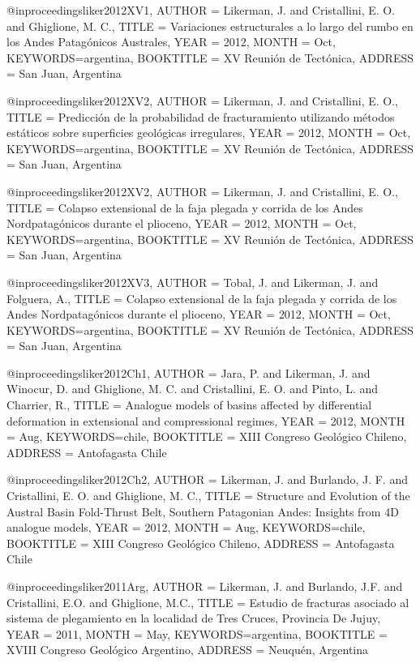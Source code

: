 @inproceedings{liker2012XV1,
  AUTHOR = {Likerman, J. and Cristallini, E. O. and Ghiglione, M. C.},
  TITLE = {{Variaciones estructurales a lo largo del rumbo en los Andes Patag{\'o}nicos Australes}},
  YEAR = {2012},
  MONTH = Oct,
  KEYWORDS={argentina},
  BOOKTITLE = {{XV Reuni{\'o}n de Tect{\'o}nica}},
  ADDRESS = {San Juan, Argentina}
}

@inproceedings{liker2012XV2,
  AUTHOR = {Likerman, J. and Cristallini, E. O.},
  TITLE = {{Predicci{\'o}n de la probabilidad de fracturamiento utilizando m{\'e}todos est{\'a}ticos sobre superficies geol{\'o}gicas irregulares}},
  YEAR = {2012},
  MONTH = Oct,
  KEYWORDS={argentina},
  BOOKTITLE = {{XV Reuni{\'o}n de Tect{\'o}nica}},
  ADDRESS = {San Juan, Argentina}
}

@inproceedings{liker2012XV2,
  AUTHOR = {Likerman, J. and Cristallini, E. O.},
  TITLE = {{Colapso extensional de la faja plegada y corrida de los Andes Nordpatag{\'o}nicos durante el plioceno}},
  YEAR = {2012},
  MONTH = Oct,
  KEYWORDS={argentina},
  BOOKTITLE = {{XV Reuni{\'o}n de Tect{\'o}nica}},
  ADDRESS = {San Juan, Argentina}
}

@inproceedings{liker2012XV3,
  AUTHOR = {Tobal, J. and Likerman, J. and Folguera, A.},
  TITLE = {{Colapso extensional de la faja plegada y corrida de los Andes Nordpatag{\'o}nicos durante el plioceno}},
  YEAR = {2012},
  MONTH = Oct,
  KEYWORDS={argentina},
  BOOKTITLE = {{XV Reuni{\'o}n de Tect{\'o}nica}},
  ADDRESS = {San Juan, Argentina}
}

@inproceedings{liker2012Ch1,
  AUTHOR = {Jara, P. and Likerman, J. and Winocur, D. and Ghiglione, M. C. and Cristallini, E. O. and Pinto, L. and Charrier, R.},
  TITLE = {{Analogue models of basins affected by differential deformation in extensional and compressional regimes}},
  YEAR = {2012},
  MONTH = Aug,
  KEYWORDS={chile},
  BOOKTITLE = {{XIII Congreso Geol{\'o}gico Chileno}},
  ADDRESS = {Antofagasta Chile}
}

@inproceedings{liker2012Ch2,
  AUTHOR = {Likerman, J. and Burlando, J. F. and Cristallini, E. O. and Ghiglione, M. C.},
  TITLE = {{Structure and Evolution of the Austral Basin Fold-Thrust Belt, Southern Patagonian Andes: Insights from 4D analogue models}},
  YEAR = {2012},
  MONTH = Aug,
  KEYWORDS={chile},
  BOOKTITLE = {{XIII Congreso Geol{\'o}gico Chileno}},
  ADDRESS = {Antofagasta Chile}
}

@inproceedings{liker2011Arg,
  AUTHOR = {Likerman, J. and Burlando, J.F. and Cristallini, E.O. and Ghiglione, M.C.},
  TITLE = {{Estudio de fracturas asociado al sistema de plegamiento en la localidad de Tres Cruces, Provincia De Jujuy}},
  YEAR = {2011},
  MONTH = May,
  KEYWORDS={argentina},
  BOOKTITLE = {{XVIII Congreso Geol{\'o}gico Argentino}},
  ADDRESS = {Neuqu{\'e}n, Argentina}
}

